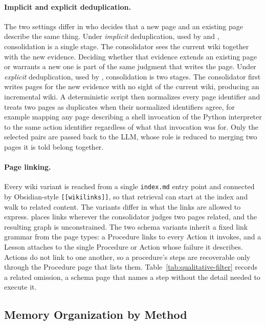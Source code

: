 \paragraph{Implicit and explicit deduplication.}
The two settings differ in who decides that a new page and an existing
page describe the same thing. Under \emph{implicit} deduplication, used by  and , consolidation is a single stage. The
consolidator sees the current wiki together with the new evidence. Deciding
whether that evidence
extends an existing page or warrants a new one is part of the same judgment
that writes the page. Under \emph{explicit} deduplication, used by , consolidation is two stages. The consolidator first writes pages for
the new evidence with no sight of the current wiki, producing an incremental
wiki. A deterministic script then normalizes every page identifier and treats
two pages as duplicates when their normalized identifiers agree, for example
mapping any page describing a shell invocation of the Python interpreter to the
same action identifier regardless of what that invocation was for. Only the
selected pairs are passed back to the LLM, whose role is reduced to merging two
pages it is told belong together.

\paragraph{Page linking.}
Every wiki variant is reached from a single \texttt{index.md} entry
point and connected by Obsidian-style \texttt{[[wikilinks]]}, so that retrieval
can start at the index and walk to related content. The variants differ in what
the links are allowed to express.  places links wherever the
consolidator judges two pages related, and the resulting graph is unconstrained.
The two schema variants inherit a fixed link grammar from the page types: a
Procedure links to every Action it invokes, and a Lesson attaches to the single
Procedure or Action whose failure it describes. Actions do not link to one
another, so a procedure's steps are recoverable only through the Procedure page
that lists them. Table~\ref{tab:qualitative-filter} records a related
omission, a schema page that names a step without the detail needed to execute
it.

\subsection{Memory Organization by Method}

